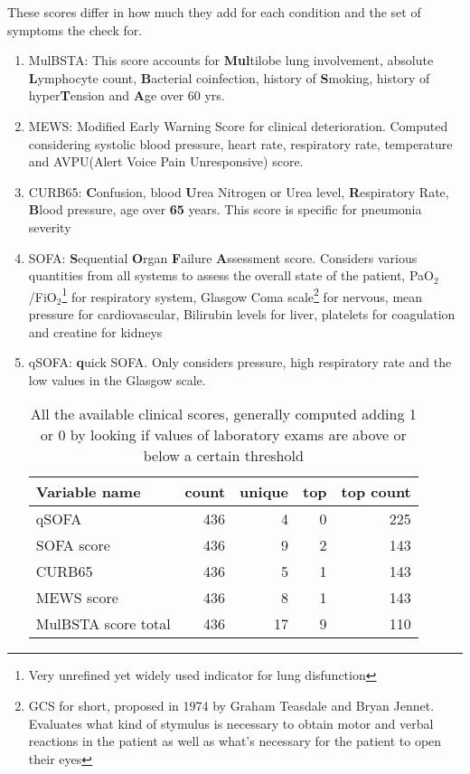 \begin{enumerate}
These scores differ in how much they add for each condition and the set of symptoms the check for.
	\begin{enumerate}
		\item MulBSTA: This score accounts for \textbf{Mul}tilobe lung involvement, absolute \textbf{L}ymphocyte count, \textbf{B}acterial coinfection, history of \textbf{S}moking, history of hyper\textbf{T}ension and \textbf{A}ge over 60 yrs. \cite{MulBSTA}
		\item MEWS: Modified Early Warning Score for clinical deterioration. Computed considering systolic blood pressure, heart rate, respiratory rate, temperature and AVPU(Alert Voice Pain Unresponsive) score. \cite{MEWS}
		\item CURB65: \textbf{C}onfusion, blood \textbf{U}rea Nitrogen or Urea level, \textbf{R}espiratory Rate, \textbf{B}lood pressure, age over \textbf{65} years. This score is specific for pneumonia severity \cite{CURB65}
		\item SOFA:  \textbf{S}equential  \textbf{O}rgan  \textbf{F}ailure  \textbf{A}ssessment score. Considers various quantities from all systems to assess the overall state of the patient, PaO$_2$/FiO$_2$\footnote{Very unrefined yet widely used indicator for lung disfunction} for respiratory system, Glasgow Coma scale\footnote{GCS for short, proposed in 1974 by Graham Teasdale and Bryan Jennet. Evaluates what kind of stymulus is necessary to obtain motor and verbal reactions in the patient as well as what's necessary for the patient to open their eyes} for nervous, mean pressure for cardiovascular, Bilirubin levels for liver, platelets for coagulation and creatine for kidneys \cite{SOFA}
		\item qSOFA:  \textbf{q}uick SOFA. Only considers pressure, high respiratory rate and the low values in the Glasgow scale.
			\begin{table}[htbp]
			\caption{All the available clinical scores, generally computed adding 1 or 0 by looking if values of laboratory exams are above or below a certain threshold \label{tab:ClinicalScores}}
\centering
			\begin{tabular}{lrrrr}
			\toprule
			Variable name &  count &  unique &  top &  top count \\
			\midrule
			qSOFA               &    436 &       4 &    0 &   225 \\
			SOFA score          &    436 &       9 &    2 &   143 \\
			CURB65              &    436 &       5 &    1 &   143 \\
			MEWS score          &    436 &       8 &    1 &   143 \\
			MulBSTA score total &    436 &      17 &    9 &   110 \\
			\bottomrule
			\end{tabular}
			\end{table}
	\end{enumerate}
\end{enumerate}

